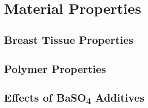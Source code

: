\section{Material Properties\label{sec:literatureReview:materials}}

\subsection{Breast Tissue Properties\label{sec:literatureReview:materials:breast}}

\subsection{Polymer Properties\label{sec:literatureReview:materials:polymers}}

\subsection{Effects of BaSO\textsubscript{4} Additives\label{sec:literatureReview:materials:BaSO4}}
